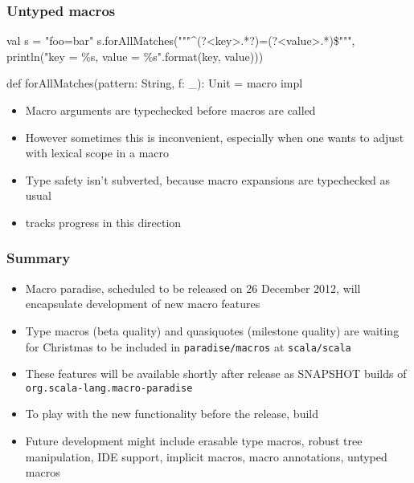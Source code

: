 \documentclass[svgnames,hyperref={bookmarks=false}]{beamer}
\begin{document}
\begin{frame}[fragile]
\frametitle{Untyped macros}
\begin{semiverbatim}
val s = "foo=bar"
s.forAllMatches("""^(?<key>.*?)=(?<value>.*)\$""",
    println("key = \%s, value = \%s".format(key, value)))

def forAllMatches(pattern: String, f: _): Unit = macro impl

\end{semiverbatim}

\begin{itemize}
\item Macro arguments are typechecked before macros are called
\item However sometimes this is inconvenient, especially when one wants to adjust with lexical scope in a macro
\item Type safety isn't subverted, because macro expansions are typechecked as usual
\item {} tracks progress in this direction
\end{itemize}
\end{frame}

\begin{frame}[fragile]
\frametitle{}

\vskip40pt
\begin{center}
\end{center}
\end{frame}

\begin{frame}[fragile]
\frametitle{Summary}

\begin{itemize}
\item Macro paradise, scheduled to be released on 26 December 2012, will encapsulate development of new macro features
\item Type macros (beta quality) and quasiquotes (milestone quality) are waiting for Christmas to be included in \texttt{paradise/macros} at \texttt{scala/scala}
\item These features will be available shortly after release as SNAPSHOT builds of \texttt{org.scala-lang.macro-paradise}
\item To play with the new functionality before the release, build 
\item Future development might include erasable type macros, robust tree manipulation, IDE support, implicit macros, macro annotations, untyped macros
\end{itemize}
\end{frame}
\end{document}
